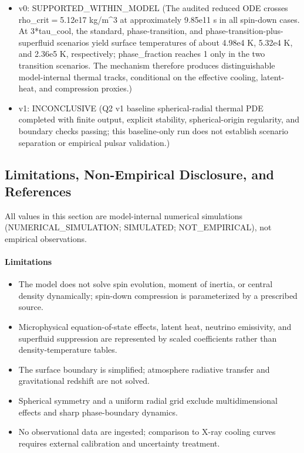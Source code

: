 \documentclass[11pt]{article}
\begin{document}
\begin{itemize}\raggedright
\item v0: SUPPORTED\_\allowbreak{}WITHIN\_\allowbreak{}MODEL (The audited reduced ODE crosses rho\_\allowbreak{}crit\ensuremath{=}5.12e17 kg/\allowbreak{}m\textasciicircum{}3 at approximately 9.85e11 s in all spin-down cases. At 3*tau\_\allowbreak{}cool, the standard, phase-transition, and phase-transition-plus-superfluid scenarios yield surface temperatures of about 4.98e4 K, 5.32e4 K, and 2.36e5 K, respectively; phase\_\allowbreak{}fraction reaches 1 only in the two transition scenarios. The mechanism therefore produces distinguishable model-internal thermal tracks, conditional on the effective cooling, latent-heat, and compression proxies.)
\item v1: INCONCLUSIVE (Q2 v1 baseline spherical-radial thermal PDE completed with finite output, explicit stability, spherical-origin regularity, and boundary checks passing; this baseline-only run does not establish scenario separation or empirical pulsar validation.)
\end{itemize}

\subsection{Limitations, Non-Empirical Disclosure, and References}

\noindent All values in this section are model-internal numerical simulations (NUMERICAL\_SIMULATION; SIMULATED; NOT\_EMPIRICAL), not empirical observations.

\paragraph{Limitations}
\begin{itemize}\raggedright
\item The model does not solve spin evolution, moment of inertia, or central density dynamically; spin-down compression is parameterized by a prescribed source.
\item Microphysical equation-of-state effects, latent heat, neutrino emissivity, and superfluid suppression are represented by scaled coefficients rather than density-temperature tables.
\item The surface boundary is simplified; atmosphere radiative transfer and gravitational redshift are not solved.
\item Spherical symmetry and a uniform radial grid exclude multidimensional effects and sharp phase-boundary dynamics.
\item No observational data are ingested; comparison to X-ray cooling curves requires external calibration and uncertainty treatment.
\end{itemize}
\end{document}
